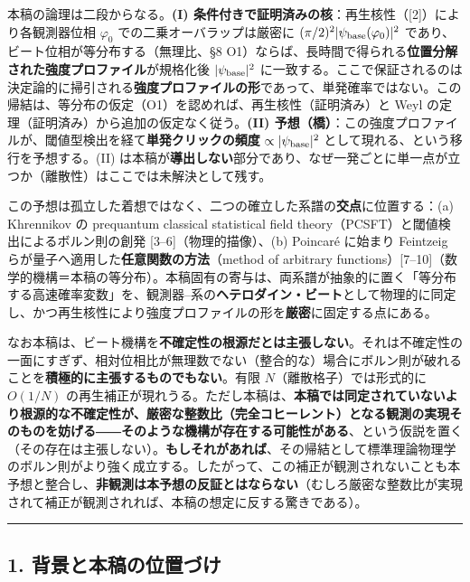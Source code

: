 \documentclass[
]{ltjsarticle}
\begin{document}
本稿の論理は二段からなる。\textbf{(I)
条件付きで証明済みの核}：再生核性（{[}2{]}）により各観測器位相
\(\varphi_0\) での二乗オーバラップは厳密に
\((\pi/2)^2|\psi_{\rm base}(\varphi_0)|^2\)
であり、ビート位相が等分布する（無理比、§8
O1）ならば、長時間で得られる\textbf{位置分解された強度プロファイル}が規格化後
\(|\psi_{\rm base}|^2\)
に一致する。ここで保証されるのは決定論的に掃引される\textbf{強度プロファイルの形}であって、単発確率ではない。この帰結は、等分布の仮定（O1）を認めれば、再生核性（証明済み）と
Weyl の定理（証明済み）から追加の仮定なく従う。\textbf{(II)
予想（橋）}：この強度プロファイルが、閾値型検出を経て\textbf{単発クリックの頻度}
\(\propto|\psi_{\rm base}|^2\) として現れる、という移行を予想する。(II)
は本稿が\textbf{導出しない}部分であり、なぜ一発ごとに単一点が立つか（離散性）はここでは未解決として残す。

この予想は孤立した着想ではなく、二つの確立した系譜の\textbf{交点}に位置する：(a)
Khrennikov の prequantum classical statistical field
theory（PCSFT）と閾値検出によるボルン則の創発
{[}3--6{]}（物理的描像）、(b) Poincaré に始まり Feintzeig
らが量子へ適用した\textbf{任意関数の方法}（method of arbitrary
functions）{[}7--10{]}（数学的機構＝本稿の等分布）。本稿固有の寄与は、両系譜が抽象的に置く「等分布する高速確率変数」を、観測器--系の\textbf{ヘテロダイン・ビート}として物理的に同定し、かつ再生核性により強度プロファイルの形を\textbf{厳密}に固定する点にある。

なお本稿は、ビート機構を\textbf{不確定性の根源だとは主張しない}。それは不確定性の一面にすぎず、相対位相比が無理数でない（整合的な）場合にボルン則が破れることを\textbf{積極的に主張するものでもない}。有限
\(N\)（離散格子）では形式的に \(O(1/N)\)
の再生補正が現れうる。ただし本稿は、\textbf{本稿では同定されていないより根源的な不確定性が、厳密な整数比（完全コヒーレント）となる観測の実現そのものを妨げる――そのような機構が存在する可能性がある}、という仮説を置く（その存在は主張しない）。\textbf{もしそれがあれば}、その帰結として標準理論物理学のボルン則がより強く成立する。したがって、この補正が観測されないことも本予想と整合し、\textbf{非観測は本予想の反証とはならない}（むしろ厳密な整数比が実現されて補正が観測されれば、本稿の想定に反する驚きである）。

\begin{center}\rule{0.5\linewidth}{0.5pt}\end{center}

\subsection{1.
背景と本稿の位置づけ}\label{ux80ccux666fux3068ux672cux7a3fux306eux4f4dux7f6eux3065ux3051}
\end{document}
